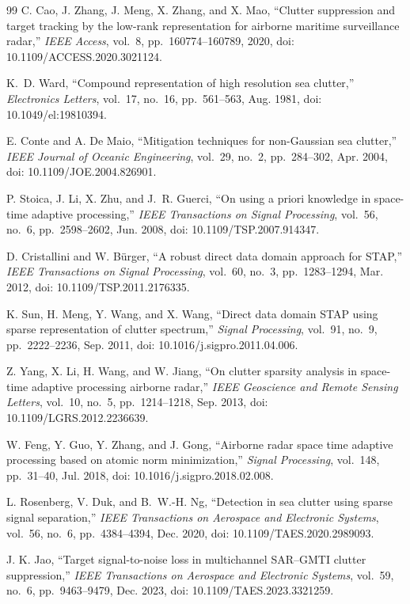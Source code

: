 \documentclass[journal]{IEEEtran}
\begin{document}
\begin{thebibliography}{99}
C. Cao, J. Zhang, J. Meng, X. Zhang, and X. Mao, ``Clutter suppression and target tracking by the low-rank representation for airborne maritime surveillance radar,'' \emph{IEEE Access}, vol.~8, pp.~160774--160789, 2020, doi: 10.1109/ACCESS.2020.3021124.

K.~D. Ward, ``Compound representation of high resolution sea clutter,'' \emph{Electronics Letters}, vol.~17, no.~16, pp.~561--563, Aug. 1981, doi: 10.1049/el:19810394.

E. Conte and A. De Maio, ``Mitigation techniques for non-Gaussian sea clutter,'' \emph{IEEE Journal of Oceanic Engineering}, vol.~29, no.~2, pp.~284--302, Apr. 2004, doi: 10.1109/JOE.2004.826901.

P. Stoica, J. Li, X. Zhu, and J.~R. Guerci, ``On using a priori knowledge in space-time adaptive processing,'' \emph{IEEE Transactions on Signal Processing}, vol.~56, no.~6, pp.~2598--2602, Jun. 2008, doi: 10.1109/TSP.2007.914347.

D. Cristallini and W. B\"{u}rger, ``A robust direct data domain approach for STAP,'' \emph{IEEE Transactions on Signal Processing}, vol.~60, no.~3, pp.~1283--1294, Mar. 2012, doi: 10.1109/TSP.2011.2176335.

K. Sun, H. Meng, Y. Wang, and X. Wang, ``Direct data domain STAP using sparse representation of clutter spectrum,'' \emph{Signal Processing}, vol.~91, no.~9, pp.~2222--2236, Sep. 2011, doi: 10.1016/j.sigpro.2011.04.006.

Z. Yang, X. Li, H. Wang, and W. Jiang, ``On clutter sparsity analysis in space-time adaptive processing airborne radar,'' \emph{IEEE Geoscience and Remote Sensing Letters}, vol.~10, no.~5, pp.~1214--1218, Sep. 2013, doi: 10.1109/LGRS.2012.2236639.

W. Feng, Y. Guo, Y. Zhang, and J. Gong, ``Airborne radar space time adaptive processing based on atomic norm minimization,'' \emph{Signal Processing}, vol.~148, pp.~31--40, Jul. 2018, doi: 10.1016/j.sigpro.2018.02.008.

L. Rosenberg, V. Duk, and B.~W.-H. Ng, ``Detection in sea clutter using sparse signal separation,'' \emph{IEEE Transactions on Aerospace and Electronic Systems}, vol.~56, no.~6, pp.~4384--4394, Dec. 2020, doi: 10.1109/TAES.2020.2989093.

J. K. Jao, ``Target signal-to-noise loss in multichannel SAR--GMTI clutter suppression,'' \emph{IEEE Transactions on Aerospace and Electronic Systems}, vol.~59, no.~6, pp.~9463--9479, Dec. 2023, doi: 10.1109/TAES.2023.3321259.


\end{thebibliography}
\end{document}
